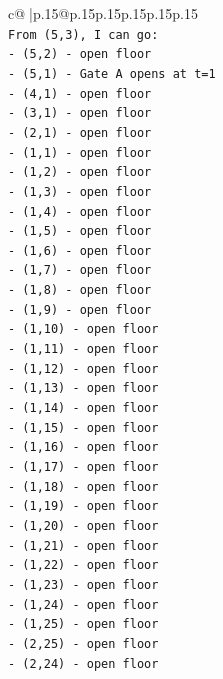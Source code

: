 \documentclass{article}
\begin{document}
{\begin{supertabular}{c@{$\;$}|p{.15\linewidth}@{}p{.15\linewidth}p{.15\linewidth}p{.15\linewidth}p{.15\linewidth}p{.15\linewidth}}
{{{\\ 
\texttt{From (5,3), I can go:} \\
\texttt{{-} (5,2) {-} open floor} \\
\texttt{{-} (5,1) {-} Gate A opens at t=1} \\
\texttt{{-} (4,1) {-} open floor} \\
\texttt{{-} (3,1) {-} open floor} \\
\texttt{{-} (2,1) {-} open floor} \\
\texttt{{-} (1,1) {-} open floor} \\
\texttt{{-} (1,2) {-} open floor} \\
\texttt{{-} (1,3) {-} open floor} \\
\texttt{{-} (1,4) {-} open floor} \\
\texttt{{-} (1,5) {-} open floor} \\
\texttt{{-} (1,6) {-} open floor} \\
\texttt{{-} (1,7) {-} open floor} \\
\texttt{{-} (1,8) {-} open floor} \\
\texttt{{-} (1,9) {-} open floor} \\
\texttt{{-} (1,10) {-} open floor} \\
\texttt{{-} (1,11) {-} open floor} \\
\texttt{{-} (1,12) {-} open floor} \\
\texttt{{-} (1,13) {-} open floor} \\
\texttt{{-} (1,14) {-} open floor} \\
\texttt{{-} (1,15) {-} open floor} \\
\texttt{{-} (1,16) {-} open floor} \\
\texttt{{-} (1,17) {-} open floor} \\
\texttt{{-} (1,18) {-} open floor} \\
\texttt{{-} (1,19) {-} open floor} \\
\texttt{{-} (1,20) {-} open floor} \\
\texttt{{-} (1,21) {-} open floor} \\
\texttt{{-} (1,22) {-} open floor} \\
\texttt{{-} (1,23) {-} open floor} \\
\texttt{{-} (1,24) {-} open floor} \\
\texttt{{-} (1,25) {-} open floor} \\
\texttt{{-} (2,25) {-} open floor} \\
\texttt{{-} (2,24) {-} open floor} \\
}}}
\end{supertabular}}
\end{document}
